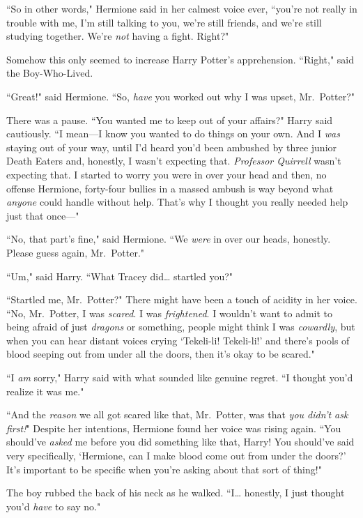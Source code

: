 ``So in other words," Hermione said in her calmest voice ever, ``you're not really in trouble with me, I'm still talking to you, we're still friends, and we're still studying together. We're \emph{not} having a fight. Right?"

Somehow this only seemed to increase Harry Potter's apprehension. ``Right," said the Boy-Who-Lived.

``Great!" said Hermione. ``So, \emph{have} you worked out why I was upset, Mr.~Potter?"

There was a pause. ``You wanted me to keep out of your affairs?" Harry said cautiously. ``I mean—I know you wanted to do things on your own. And I \emph{was} staying out of your way, until I'd heard you'd been ambushed by three junior Death Eaters and, honestly, I wasn't expecting that. \emph{Professor Quirrell} wasn't expecting that. I started to worry you were in over your head and then, no offense Hermione, forty-four bullies in a massed ambush is way beyond what \emph{anyone} could handle without help. That's why I thought you really needed help just that once—"

``No, that part's fine," said Hermione. ``We \emph{were} in over our heads, honestly. Please guess again, Mr.~Potter."

``Um," said Harry. ``What Tracey did{\ldots} startled you?"

``Startled me, Mr.~Potter?" There might have been a touch of acidity in her voice. ``No, Mr.~Potter, I was \emph{scared}. I was \emph{frightened}. I wouldn't want to admit to being afraid of just \emph{dragons} or something, people might think I was \emph{cowardly}, but when you can hear distant voices crying `Tekeli-li! Tekeli-li!' and there's pools of blood seeping out from under all the doors, then it's okay to be scared."

``I \emph{am} sorry," Harry said with what sounded like genuine regret. ``I thought you'd realize it was me."

``And the \emph{reason} we all got scared like that, Mr.~Potter, was that \emph{you didn't ask first!}" Despite her intentions, Hermione found her voice was rising again. ``You should've \emph{asked} me before you did something like that, Harry! You should've said very specifically, `Hermione, can I make blood come out from under the doors?' It's important to be specific when you're asking about that sort of thing!"

The boy rubbed the back of his neck as he walked. ``I{\ldots} honestly, I just thought you'd \emph{have} to say no."


